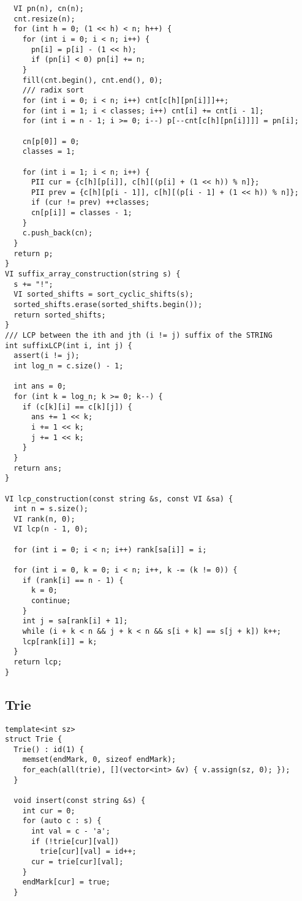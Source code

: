 \documentclass[FSZ,a4paper,onesided]{article}
\begin{document}
\begin{multicols*}{\COLS}
\begin{lstlisting}
  VI pn(n), cn(n);
  cnt.resize(n);
  for (int h = 0; (1 << h) < n; h++) {
    for (int i = 0; i < n; i++) {
      pn[i] = p[i] - (1 << h);
      if (pn[i] < 0) pn[i] += n;
    }
    fill(cnt.begin(), cnt.end(), 0);
    /// radix sort
    for (int i = 0; i < n; i++) cnt[c[h][pn[i]]]++;
    for (int i = 1; i < classes; i++) cnt[i] += cnt[i - 1];
    for (int i = n - 1; i >= 0; i--) p[--cnt[c[h][pn[i]]]] = pn[i];

    cn[p[0]] = 0;
    classes = 1;

    for (int i = 1; i < n; i++) {
      PII cur = {c[h][p[i]], c[h][(p[i] + (1 << h)) % n]};
      PII prev = {c[h][p[i - 1]], c[h][(p[i - 1] + (1 << h)) % n]};
      if (cur != prev) ++classes;
      cn[p[i]] = classes - 1;
    }
    c.push_back(cn);
  }
  return p;
}
VI suffix_array_construction(string s) {
  s += "!";
  VI sorted_shifts = sort_cyclic_shifts(s);
  sorted_shifts.erase(sorted_shifts.begin());
  return sorted_shifts;
}
/// LCP between the ith and jth (i != j) suffix of the STRING
int suffixLCP(int i, int j) {
  assert(i != j);
  int log_n = c.size() - 1;

  int ans = 0;
  for (int k = log_n; k >= 0; k--) {
    if (c[k][i] == c[k][j]) {
      ans += 1 << k;
      i += 1 << k;
      j += 1 << k;
    }
  }
  return ans;
}

VI lcp_construction(const string &s, const VI &sa) {
  int n = s.size();
  VI rank(n, 0);
  VI lcp(n - 1, 0);

  for (int i = 0; i < n; i++) rank[sa[i]] = i;

  for (int i = 0, k = 0; i < n; i++, k -= (k != 0)) {
    if (rank[i] == n - 1) {
      k = 0;
      continue;
    }
    int j = sa[rank[i] + 1];
    while (i + k < n && j + k < n && s[i + k] == s[j + k]) k++;
    lcp[rank[i]] = k;
  }
  return lcp;
}
\end{lstlisting}
\subsection{Trie}
\begin{lstlisting}
template<int sz>
struct Trie {
  Trie() : id(1) {
    memset(endMark, 0, sizeof endMark);
    for_each(all(trie), [](vector<int> &v) { v.assign(sz, 0); });
  }

  void insert(const string &s) {
    int cur = 0;
    for (auto c : s) {
      int val = c - 'a';
      if (!trie[cur][val])
        trie[cur][val] = id++;
      cur = trie[cur][val];
    }
    endMark[cur] = true;
  }


\end{lstlisting}
\end{multicols*}
\end{document}
